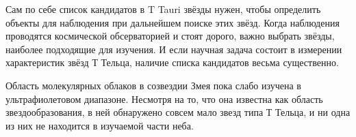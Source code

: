 Сам по себе список кандидатов в T Tauri звёзды нужен, чтобы определить объекты для наблюдения при дальнейшем поиске этих звёзд. Когда наблюдения проводятся космической обсерваторией и стоят дорого, важно выбрать звёзды, наиболее подходящие для изучения. И если научная задача состоит в измерении характеристик звёзд Т Тельца, наличие списка кандидатов весьма существенно.

Область молекулярных облаков в созвездии Змея пока слабо изучена в ультрафиолетовом диапазоне. Несмотря на то, что она известна как область звездообразования, в ней обнаружено совсем мало звезд типа Т Тельца, и ни одна из них не находится в изучаемой части неба.

